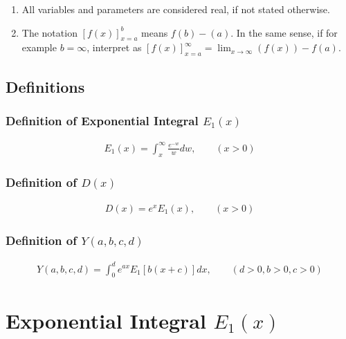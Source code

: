 \documentclass[bibliography=totocnumbered]{scrartcl}
\newcommand{\assume}[1][\text{MISSING PARAMETER}]{,\qquad\left(#1\right)}
\begin{document}
	\begin{enumerate}
		\item All variables and parameters are considered real, if not stated otherwise.
		\item The notation $\left[f\left(x\right)\right]_{x=a}^{b}$ means $f\left(b\right)-\left(a\right)$. In the same sense, if for example $b=\infty$, interpret as $\left[f\left(x\right)\right]_{x=a}^{\infty}=\lim_{x\rightarrow{}\infty}\left(f\left(x\right)\right)-f\left(a\right)$.
	\end{enumerate}

	\subsection{Definitions}

	\subsubsection[Definition of Exponential Integral $E_1\left(x\right)$]{Definition of Exponential Integral $E_1\left(x\right)$}

	\begin{gather}
		E_1\left(x\right)=\int_{x}^{\infty}\frac{e^{-w}}{w}dw\assume[x>0]\label{eq: E1}
	\end{gather}

	\subsubsection{Definition of $D\left(x\right)$}
	\label{subsubsec: D}

	\begin{gather}
		D\left(x\right)=e^xE_1\left(x\right)\assume[x>0]\label{eq: D}
	\end{gather}

	\subsubsection{Definition of $Y\left(a, b, c, d\right)$}

	\begin{gather}
		Y\left(a, b, c, d\right)=\int_{0}^{d}e^{ax}E_1\left[b\left(x+c\right)\right]dx\assume[d>0,b>0,c>0]\label{eq: Y}
	\end{gather}

	\clearpage

	\section[Exponential Integral $E_1\left(x\right)$]{Exponential Integral $E_1\left(x\right)$}
\end{document}

